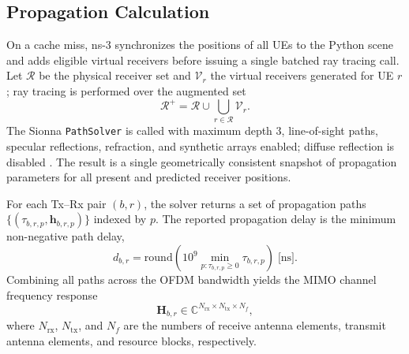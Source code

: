 \subsection{Propagation Calculation}
\label{subsec:propagation-calculation}

On a cache miss, ns-3 synchronizes the positions of all UEs to the Python
scene and adds eligible virtual receivers before issuing a single batched ray
tracing call.
Let $\mathcal{R}$ be the physical receiver set and $\mathcal{V}_r$ the virtual
receivers generated for UE $r$; ray tracing is performed over the augmented set
\begin{equation}
    \mathcal{R}^{+}
    =
    \mathcal{R}\cup\bigcup_{r\in\mathcal{R}}\mathcal{V}_r .
\end{equation}
The Sionna \texttt{PathSolver} is called with maximum depth $3$, line-of-sight
paths, specular reflections, refraction, and synthetic arrays enabled; diffuse
reflection is disabled \cite{sionnart,alsamman_mmwave,raymobtime_sionna}.
The result is a single geometrically consistent snapshot of propagation
parameters for all present and predicted receiver positions.

For each Tx–Rx pair $(b,r)$, the solver returns a set of propagation paths
$\{(\tau_{b,r,p}, \mathbf{h}_{b,r,p})\}$ indexed by $p$.
The reported propagation delay is the minimum non-negative path delay,
\begin{equation}
    d_{b,r}=
    \mathrm{round}
    \left(
    10^9 \min_{p:\tau_{b,r,p}\geq 0}\tau_{b,r,p}
    \right)\;\text{[ns]}.
\end{equation}
Combining all paths across the OFDM bandwidth yields the MIMO channel frequency
response
\begin{equation}
    \mathbf{H}_{b,r}\in
    \mathbb{C}^{N_{\mathrm{rx}}\times N_{\mathrm{tx}}\times N_f},
\end{equation}
where $N_{\mathrm{rx}}$, $N_{\mathrm{tx}}$, and $N_f$ are the numbers of
receive antenna elements, transmit antenna elements, and resource blocks,
respectively.

